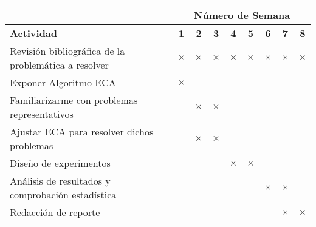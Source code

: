 \documentclass[12pt,letterpaper, xcolor=table, x11names]{article}
\newcommand{\tache}{$\boldsymbol{\times}$}
\begin{document}
\begin{center}
	
\hspace{-1.0cm}
\begin{tabular}{|l|c|c|c|c|c|c|c|c|}
\hline \rowcolor{gray}
% 
&\multicolumn{8}{c}{\bf Número de Semana}\\ \hline
% 
{\bf Actividad } 
&{\bf 1}&{\bf 2}&{\bf 3}&{\bf 4} &{\bf 5}&{\bf 6}&{\bf 7}&{\bf 8} \\ \hline
Revisión bibliográfica de la problemática a resolver
& \tache  & \tache & \tache & \tache  & \tache & \tache & \tache & \tache \\ \hline
Exponer Algoritmo ECA
& \tache  &        &        &         &        &        &        & \\ \hline
Familiarizarme con problemas representativos  
&         & \tache & \tache  & & & & & \\ \hline
Ajustar ECA para resolver dichos problemas
&          & \tache & \tache &           & & & & \\ \hline
Diseño de experimentos
&&&          & \tache & \tache  &          & & \\ \hline
Análisis de resultados y comprobación estadística
&&&&          &          & \tache & \tache &  \\ \hline
Redacción de reporte
&&&&&          &          & \tache & \tache \\ \hline
\end{tabular}
\end{center}
\end{document}
